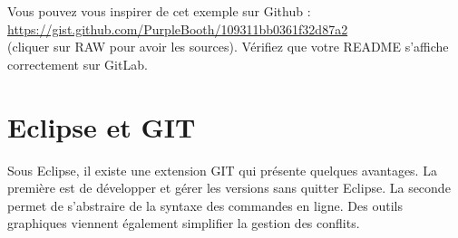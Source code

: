 \documentclass[final, a4paper, openbib, ]{article}
\begin{document}
Vous pouvez vous inspirer de cet exemple sur Github :\\
\url{https://gist.github.com/PurpleBooth/109311bb0361f32d87a2}\\
(cliquer sur RAW pour avoir les sources).
Vérifiez que votre README s'affiche correctement sur GitLab.



\section{Eclipse et GIT}

Sous Eclipse, il existe une extension GIT qui présente quelques avantages. La première est de développer et gérer les versions sans quitter Eclipse. La seconde permet de s'abstraire de la syntaxe des commandes en ligne. Des outils graphiques viennent également simplifier la gestion des conflits.
\end{document}
